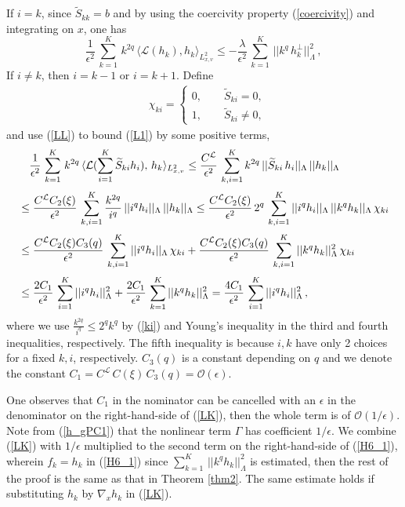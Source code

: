 \documentclass[final,onefignum,onetabnum]{siamart171218}
\begin{document}
If $i=k$, since $\widetilde S_{kk}=b$ and by using the coercivity property (\ref{coercivity}) and integrating on $x$,
one has $$\frac{1}{\epsilon^2}\, \sum_{k=1}^{K}\, k^{2q}\, \langle\mathcal L(h_k), h_k\rangle_{L^2_{x,v}}
\leq -\frac{\lambda}{\epsilon^2}\, \sum_{k=1}^{K}\,  ||k^q\, h_k^{\perp}||_{\Lambda}^2\,,$$
If $i\neq k$, then $i=k-1$ or $i=k+1$. Define
\begin{align}
&\label{chi1}\displaystyle \chi_{ki} = \begin{cases} 0, \qquad \widetilde S_{ki}=0, \\[2pt]
 1, \qquad\widetilde S_{ki}\neq 0,  \end{cases}
\end{align}
and use (\ref{LL}) to bound (\ref{L1}) by some positive terms,
\begin{align}
&\displaystyle\quad\frac{1}{\epsilon^2}\, \sum_{k=1}^{K}\, k^{2q}\, \langle \mathcal L(\sum_{i=1}^{K} \widetilde S_{ki} h_i), \, h_k\rangle_{L^2_{x,v}} \leq \frac{C^{\mathcal L}}{\epsilon^2}\, \sum_{k,i=1}^{K} k^{2q}\, ||\widetilde S_{ki}\, h_i||_{\Lambda}\, ||h_k||_{\Lambda}\notag\\[2pt]
&\displaystyle \leq \frac{C^{\mathcal L} C_2(\xi)}{\epsilon^2}\, \sum_{k,i=1}^{K} \frac{k^{2q}}{i^q}\, ||i^q h_i||_{\Lambda}\, ||h_k||_{\Lambda}
\leq \frac{C^{\mathcal L} C_2(\xi)}{\epsilon^2}\, 2^q\, \sum_{k,i=1}^{K}  ||i^q h_i||_{\Lambda}\, ||k^q h_k||_{\Lambda}\, \chi_{ki}\notag\\[2pt]
&\displaystyle \leq \frac{C^{\mathcal L} C_2(\xi) C_3(q)}{\epsilon^2}\, \sum_{k,i=1}^{K}  ||i^q h_i||_{\Lambda}\, \chi_{ki} + \frac{C^{\mathcal L} C_2(\xi)C_3(q)}{\epsilon^2}\, \sum_{k,i=1}^{K} ||k^q h_k||_{\Lambda}^2\, \chi_{ki}\notag\\[2pt]
&\displaystyle \label{LK}\leq \frac{2 C_1}{\epsilon^2}\, \sum_{i=1}^{K} ||i^q h_i||_{\Lambda}^2 + \frac{2 C_1}{\epsilon^2}\, \sum_{k=1}^{K} ||k^q h_k||_{\Lambda}^2
= \frac{4C_1}{\epsilon^2}\, \sum_{i=1}^{K} ||i^q h_i||_{\Lambda}^2\,,
\end{align}
where we use $\displaystyle\frac{k^{2q}}{i^q}\leq 2^q k^q$ by (\ref{ki}) and Young's inequality in the third and fourth inequalities, respectively. The fifth inequality is because $i,k$ have only 2 choices for a fixed $k,i$, respectively. $C_3(q)$ is a constant depending on $q$ and we denote the constant
$C_1=C^{\mathcal L}\, C(\xi)\,  C_3(q)=\mathcal O(\epsilon)$.

One observes that $C_1$ in the nominator can be cancelled with an $\epsilon$ in the denominator on the right-hand-side of (\ref{LK}), then the whole term is of $\mathcal O(1/\epsilon)$.  Note from (\ref{h_gPC1}) that the nonlinear term $\Gamma$ has coefficient $1/\epsilon$.
We combine (\ref{LK}) with $1/\epsilon$ multiplied to the second term on the right-hand-side of (\ref{H6_1}), wherein $f_k=h_k$ in (\ref{H6_1}) since $\sum_{k=1}^{K}\, ||k^q h_k||_{\Lambda}^2$
is estimated, then the rest of the proof is the same as that in Theorem \ref{thm2}.
The same estimate holds if substituting $h_k$ by $\nabla_x h_k$ in (\ref{LK}).
\end{document}
